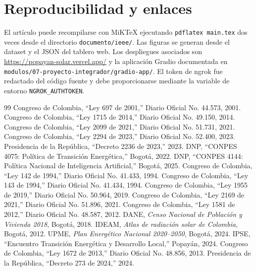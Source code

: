 \documentclass[journal]{IEEEtran}
\begin{document}
\section{Reproducibilidad y enlaces}
El artículo puede recompilarse con MiKTeX ejecutando \texttt{pdflatex main.tex} dos veces desde el directorio \texttt{documento/ieee/}. Las figuras se generan desde el dataset y el JSON del tablero web. Los despliegues asociados son \url{https://popayan-solar.vercel.app/} y la aplicación Gradio documentada en \texttt{modulos/07-proyecto-integrador/gradio-app/}. El token de ngrok fue redactado del código fuente y debe proporcionarse mediante la variable de entorno \texttt{NGROK\_AUTHTOKEN}.





\begin{thebibliography}{99}
 Congreso de Colombia, ``Ley 697 de 2001,'' Diario Oficial No. 44.573, 2001.
 Congreso de Colombia, ``Ley 1715 de 2014,'' Diario Oficial No. 49.150, 2014.
 Congreso de Colombia, ``Ley 2099 de 2021,'' Diario Oficial No. 51.731, 2021.
 Congreso de Colombia, ``Ley 2294 de 2023,'' Diario Oficial No. 52.400, 2023.
 Presidencia de la República, ``Decreto 2236 de 2023,'' 2023.
 DNP, ``CONPES 4075: Política de Transición Energética,'' Bogotá, 2022.
 DNP, ``CONPES 4144: Política Nacional de Inteligencia Artificial,'' Bogotá, 2025.
 Congreso de Colombia, ``Ley 142 de 1994,'' Diario Oficial No. 41.433, 1994.
 Congreso de Colombia, ``Ley 143 de 1994,'' Diario Oficial No. 41.434, 1994.
 Congreso de Colombia, ``Ley 1955 de 2019,'' Diario Oficial No. 50.964, 2019.
 Congreso de Colombia, ``Ley 2169 de 2021,'' Diario Oficial No. 51.896, 2021.
 Congreso de Colombia, ``Ley 1581 de 2012,'' Diario Oficial No. 48.587, 2012.
 DANE, \emph{Censo Nacional de Población y Vivienda 2018}, Bogotá, 2018.
 IDEAM, \emph{Atlas de radiación solar de Colombia}, Bogotá, 2012.
 UPME, \emph{Plan Energético Nacional 2020--2050}, Bogotá, 2024.
 IPSE, ``Encuentro Transición Energética y Desarrollo Local,'' Popayán, 2024.
 Congreso de Colombia, ``Ley 1672 de 2013,'' Diario Oficial No. 48.856, 2013.
 Presidencia de la República, ``Decreto 273 de 2024,'' 2024.
\end{thebibliography}
\end{document}
